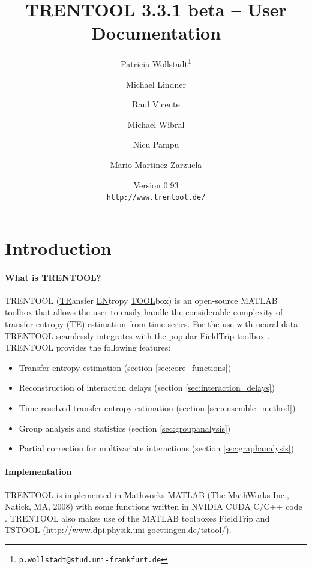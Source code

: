 \documentclass[a4paper,10pt]{article}
\begin{document}
\title{TRENTOOL 3.3.1 beta -- User Documentation}
\author{Patricia Wollstadt\thanks{\texttt{p.wollstadt@stud.uni-frankfurt.de}} \and Michael Lindner \and Raul Vicente \and Michael Wibral \and Nicu Pampu \and Mario Martinez-Zarzuela}
\date{Version 0.93\\ 
\texttt{http://www.trentool.de/}}

\maketitle
\tableofcontents
\newpage
\listoffigures
\listoftables
\listoflistings

\newpage
\section{Introduction}

\paragraph*{What is TRENTOOL?} TRENTOOL (\underline{TR}ansfer \underline{EN}tropy \underline{TOOL}box) is an open-source MATLAB toolbox that allows the user to easily handle the considerable complexity of transfer entropy (TE) estimation from time series. For the use with neural data TRENTOOL seamlessly integrates with the popular FieldTrip toolbox \cite{oostenveld2011}. TRENTOOL provides the following features:

\begin{itemize}
 \item Transfer entropy estimation (section \ref{sec:core_functions}) %
 \item Reconstruction of interaction delays (section \ref{sec:interaction_delays})
 \item Time-resolved transfer entropy estimation (section \ref{sec:ensemble_method})
 \item Group analysis and statistics (section \ref{sec:groupanalysis})
 \item Partial correction for multivariate interactions (section \ref{sec:graphanalysis})
\end{itemize}


\paragraph*{Implementation} TRENTOOL is implemented in Mathworks\textregistered{} MATLAB\textregistered{} (The MathWorks Inc., Natick, MA, 2008)  with some functions written in NVIDIA\textregistered{} CUDA\texttrademark{} C/C++ code \cite{nvidia2008}. TRENTOOL also makes use of the MATLAB toolboxes FieldTrip \cite{oostenveld2011} and TSTOOL (\url{http://www.dpi.physik.uni-goettingen.de/tstool/}).
\end{document}
